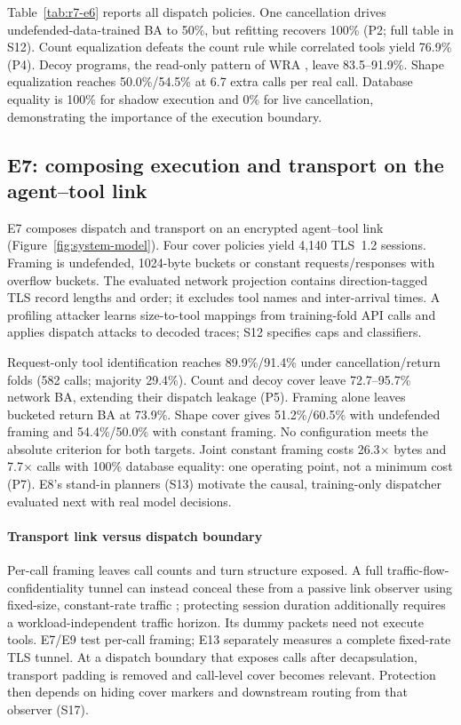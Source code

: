 Table~\ref{tab:r7-e6} reports all dispatch policies. One cancellation drives undefended-data-trained BA to 50\%, but refitting recovers 100\% (P2; full table in S12). Count equalization defeats the count rule while correlated tools yield 76.9\% (P4). Decoy programs, the read-only pattern of WRA \cite{jeong2026wra}, leave 83.5--91.9\%. Shape equalization reaches 50.0\%/54.5\% at 6.7 extra calls per real call. Database equality is 100\% for shadow execution and 0\% for live cancellation, demonstrating the importance of the execution boundary.


\subsection{E7: composing execution and transport on the agent--tool link}
E7 composes dispatch and transport on an encrypted agent--tool link (Figure~\ref{fig:system-model}). Four cover policies yield 4,140 TLS~1.2 sessions. Framing is undefended, 1024-byte buckets or constant requests/responses with overflow buckets. The evaluated network projection contains direction-tagged TLS record lengths and order; it excludes tool names and inter-arrival times. A profiling attacker learns size-to-tool mappings from training-fold API calls and applies dispatch attacks to decoded traces; S12 specifies caps and classifiers.

Request-only tool identification reaches 89.9\%/91.4\% under cancellation/return folds (582 calls; majority 29.4\%). Count and decoy cover leave 72.7--95.7\% network BA, extending their dispatch leakage (P5). Framing alone leaves bucketed return BA at 73.9\%. Shape cover gives 51.2\%/60.5\% with undefended framing and 54.4\%/50.0\% with constant framing. No configuration meets the absolute criterion for both targets. Joint constant framing costs 26.3$\times$ bytes and 7.7$\times$ calls with 100\% database equality: one operating point, not a minimum cost (P7). E8's stand-in planners (S13) motivate the causal, training-only dispatcher evaluated next with real model decisions.

\paragraph{Transport link versus dispatch boundary}
Per-call framing leaves call counts and turn structure exposed. A full traffic-flow-confidentiality tunnel can instead conceal these from a passive link observer using fixed-size, constant-rate traffic \cite{rfc9347}; protecting session duration additionally requires a workload-independent traffic horizon. Its dummy packets need not execute tools. E7/E9 test per-call framing; E13 separately measures a complete fixed-rate TLS tunnel. At a dispatch boundary that exposes calls after decapsulation, transport padding is removed and call-level cover becomes relevant. Protection then depends on hiding cover markers and downstream routing from that observer (S17).

